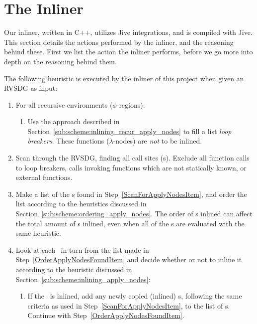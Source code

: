 
\clearpage
\section{The Inliner}
\label{sec:scheme}

Our inliner, written in C++, utilizes Jive integrations, and is compiled with
Jive. This section details the actions performed by the inliner, and the
reasoning behind these. First we list the action the inliner performs, before we
go more into depth on the reasoning behind them.

The following heuristic is executed by the inliner of this project when given an
RVSDG as input:

\begin{enumerate}
	\item For all recursive environments ($\phi$-regions):

	\begin{enumerate}
		\item Use the approach described in
Section~\ref{sub:scheme:inlining_recur_apply_nodes} to fill a list \textit{loop
breakers}. These functions ($\lambda$-nodes) are \textit{not} to be inlined.
		\label{MakeLoopBreakerListItem}
	\end{enumerate}

	\item Scan through the RVSDG, finding all call sites (\applyNode s). Exclude
all function calls to loop breakers, calls invoking functions which are not
statically known, or external functions.
	\label{ScanForApplyNodesItem}

	\item Make a list of the \applyNode s found in
Step~\ref{ScanForApplyNodesItem}, and order the list according to the heuristics
discussed in Section~\ref{sub:scheme:ordering_apply_nodes}. The order of
\applyNode s inlined can affect the total amount of \applyNode s inlined, even
when all of the \applyNode s are evaluated with the same heuristic.
\label{OrderApplyNodesFoundItem}

	\item Look at each \applyNode~in turn from the list made in
Step~\ref{OrderApplyNodesFoundItem} and decide whether or not to inline it
according to the heuristic discussed in
Section~\ref{sub:scheme:inlining_apply_nodes}:
	\label{LookAtNextCallSiteItem}

	\begin{enumerate}
		\item If the \applyNode~is inlined, add any newly copied (inlined)
\applyNode s, following the same criteria as used in
Step~\ref{ScanForApplyNodesItem}, to the list of \applyNode s. Continue with
Step~\ref{OrderApplyNodesFoundItem}.


\end{enumerate}
\end{enumerate}
